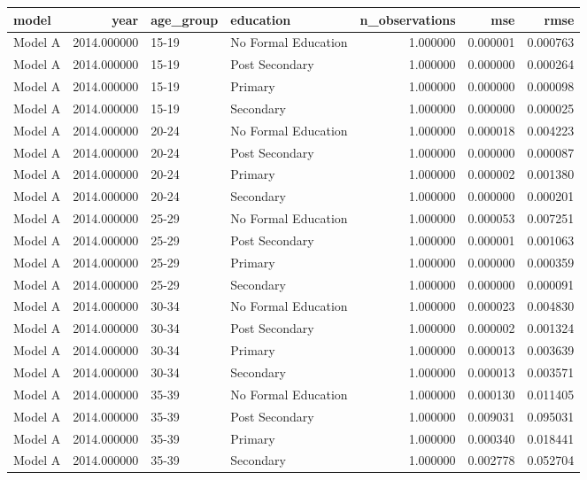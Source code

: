 \begin{table}[ht]
\centering
\begin{tabular}{lrllrrr}
\hline
model & year & age_group & education & n_observations & mse & rmse \\
\hline
Model A & 2014.000000 & 15-19 & No Formal Education & 1.000000 & 0.000001 & 0.000763 \\
Model A & 2014.000000 & 15-19 & Post Secondary & 1.000000 & 0.000000 & 0.000264 \\
Model A & 2014.000000 & 15-19 & Primary & 1.000000 & 0.000000 & 0.000098 \\
Model A & 2014.000000 & 15-19 & Secondary & 1.000000 & 0.000000 & 0.000025 \\
Model A & 2014.000000 & 20-24 & No Formal Education & 1.000000 & 0.000018 & 0.004223 \\
Model A & 2014.000000 & 20-24 & Post Secondary & 1.000000 & 0.000000 & 0.000087 \\
Model A & 2014.000000 & 20-24 & Primary & 1.000000 & 0.000002 & 0.001380 \\
Model A & 2014.000000 & 20-24 & Secondary & 1.000000 & 0.000000 & 0.000201 \\
Model A & 2014.000000 & 25-29 & No Formal Education & 1.000000 & 0.000053 & 0.007251 \\
Model A & 2014.000000 & 25-29 & Post Secondary & 1.000000 & 0.000001 & 0.001063 \\
Model A & 2014.000000 & 25-29 & Primary & 1.000000 & 0.000000 & 0.000359 \\
Model A & 2014.000000 & 25-29 & Secondary & 1.000000 & 0.000000 & 0.000091 \\
Model A & 2014.000000 & 30-34 & No Formal Education & 1.000000 & 0.000023 & 0.004830 \\
Model A & 2014.000000 & 30-34 & Post Secondary & 1.000000 & 0.000002 & 0.001324 \\
Model A & 2014.000000 & 30-34 & Primary & 1.000000 & 0.000013 & 0.003639 \\
Model A & 2014.000000 & 30-34 & Secondary & 1.000000 & 0.000013 & 0.003571 \\
Model A & 2014.000000 & 35-39 & No Formal Education & 1.000000 & 0.000130 & 0.011405 \\
Model A & 2014.000000 & 35-39 & Post Secondary & 1.000000 & 0.009031 & 0.095031 \\
Model A & 2014.000000 & 35-39 & Primary & 1.000000 & 0.000340 & 0.018441 \\
Model A & 2014.000000 & 35-39 & Secondary & 1.000000 & 0.002778 & 0.052704 \\

\end{tabular}
\end{table}
